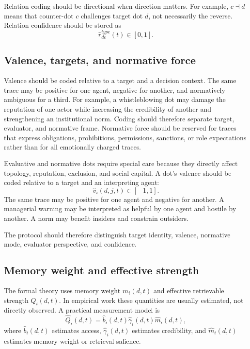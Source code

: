 \documentclass[11pt]{article}
\theoremstyle{remark}
\begin{document}
Relation coding should be directional when direction matters. For example,
\(c\dashv d\) means that counter-dot \(c\) challenges target dot \(d\),
not necessarily the reverse. Relation confidence should be stored as
\[
\widehat r_{de}^{type}(t)\in[0,1].
\]

\subsection{Valence, targets, and normative force}\label{valence-targets-norms-measurement}

Valence should be coded relative to a target and a decision context. The same trace may be positive for one agent, negative for another, and normatively ambiguous for a third. For example, a whistleblowing dot may damage the reputation of one actor while increasing the credibility of another and strengthening an institutional norm. Coding should therefore separate target, evaluator, and normative frame. Normative force should be reserved for traces that express obligations, prohibitions, permissions, sanctions, or role expectations rather than for all emotionally charged traces.


Evaluative and normative dots require special care because they directly
affect topology, reputation, exclusion, and social capital. A dot's
valence should be coded relative to a target and an interpreting agent:
\[
\widehat v_i(d,j,t)\in[-1,1].
\]
The same trace may be positive for one agent and negative for another. A
managerial warning may be interpreted as helpful by one agent and hostile
by another. A norm may benefit insiders and constrain outsiders.

The protocol should therefore distinguish target identity, valence,
normative mode, evaluator perspective, and confidence.

\subsection{Memory weight and effective strength}\label{memory-weight-effective-strength-measurement}

The formal theory uses memory weight \(m_i(d,t)\) and effective
retrievable strength \(Q_i(d,t)\). In empirical work these quantities are
usually estimated, not directly observed. A practical measurement model is
\[
\widehat Q_i(d,t)=\widehat b_i(d,t)\widehat\gamma_i(d,t)\widehat m_i(d,t),
\]
where \(\widehat b_i(d,t)\) estimates access, \(\widehat\gamma_i(d,t)\)
estimates credibility, and \(\widehat m_i(d,t)\) estimates memory weight
or retrieval salience.
\end{document}
